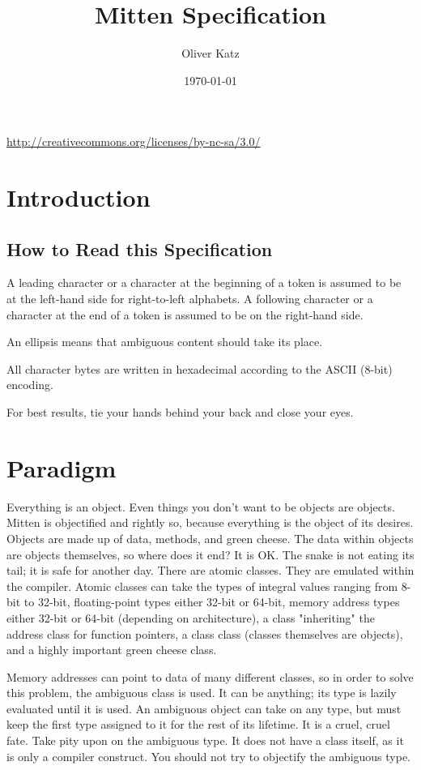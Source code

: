 \documentclass[10pt,a4paper]{article}
\author{Oliver Katz}
\title{Mitten Specification}
\date{\today}
\begin{document}
\maketitle
\begin{center}
\ccbyncsa \linebreak
\url{http://creativecommons.org/licenses/by-nc-sa/3.0/}
\end{center}
\tableofcontents

\section{Introduction}
\subsection{How to Read this Specification}
A leading character or a character at the beginning of a token is assumed to be at the left-hand side for right-to-left alphabets. A following character or a character at the end of a token is assumed to be on the right-hand side. 

An ellipsis means that ambiguous content should take its place.

All character bytes are written in hexadecimal according to the ASCII (8-bit) encoding. 

For best results, tie your hands behind your back and close your eyes.

\section{Paradigm}
Everything is an object. Even things you don't want to be objects are objects. Mitten is objectified and rightly so, because everything is the object of its desires. Objects are made up of data, methods, and green cheese. The data within objects are objects themselves, so where does it end? It is OK. The snake is not eating its tail; it is safe for another day. There are atomic classes. They are emulated within the compiler. Atomic classes can take the types of integral values ranging from 8-bit to 32-bit, floating-point types either 32-bit or 64-bit, memory address types either 32-bit or 64-bit (depending on architecture), a class "inheriting" the address class for function pointers, a class class (classes themselves are objects), and a highly important green cheese class.

Memory addresses can point to data of many different classes, so in order to solve this problem, the ambiguous class is used. It can be anything; its type is lazily evaluated until it is used. An ambiguous object can take on any type, but must keep the first type assigned to it for the rest of its lifetime. It is a cruel, cruel fate. Take pity upon on the ambiguous type. It does not have a class itself, as it is only a compiler construct. You should not try to objectify the ambiguous type.
\end{document}
